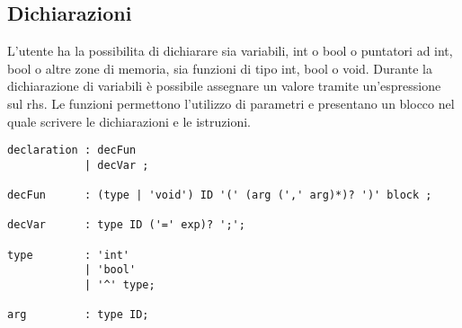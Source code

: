 \documentclass[../../main]{subfiles}
\begin{document}
\subsection{Dichiarazioni}\label{s:dichiarazioni}
L'utente ha la possibilita di dichiarare sia variabili, int o bool o puntatori ad int, bool o altre zone di memoria, sia funzioni di tipo int, bool o void.
Durante la dichiarazione di variabili è possibile assegnare un valore tramite un'espressione sul rhs.
Le funzioni permettono l'utilizzo di parametri e presentano un blocco nel quale scrivere le dichiarazioni e le istruzioni.
\begin{lstlisting}[style=antlr]
declaration : decFun    
            | decVar ;

decFun	    : (type | 'void') ID '(' (arg (',' arg)*)? ')' block ;

decVar      : type ID ('=' exp)? ';';

type        : 'int'
            | 'bool'
            | '^' type;

arg         : type ID;
\end{lstlisting}
\end{document}

